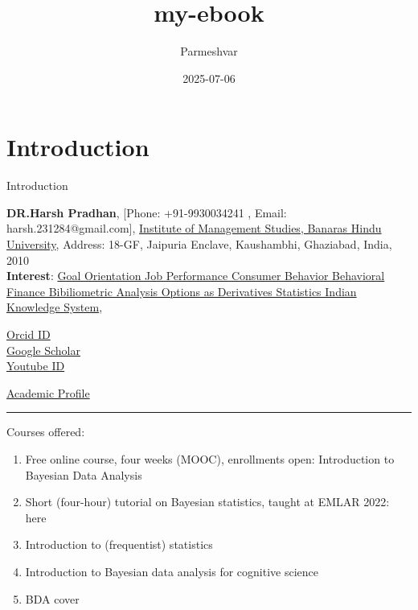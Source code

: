 \documentclass[
  letterpaper,
  DIV=11,
  numbers=noendperiod]{scrreprt}
\title{my-ebook}
\author{Parmeshvar}
\date{2025-07-06}
\providecommand{\tightlist}{%
  \setlength{\itemsep}{0pt}\setlength{\parskip}{0pt}}
\renewcommand*\contentsname{Table of contents}
\newcommand\contentsname{Table of contents}
\begin{document}
\maketitle

\renewcommand*\contentsname{Table of contents}
{
\hypersetup{linkcolor=}
\setcounter{tocdepth}{2}
\tableofcontents
}


\chapter{Introduction}\label{introduction}

Introduction

\textbf{DR.Harsh Pradhan}, {[}Phone: +91-9930034241 , Email:
harsh.231284@gmail.com{]},
\href{http://www.uni-potsdam.de/en/university-of-potsdam.html}{Institute
of Management Studies, Banaras Hindu University}, Address: 18-GF,
Jaipuria Enclave, Kaushambhi, Ghaziabad, India, 2010\\
\textbf{Interest}:
\href{http://www.uni-potsdam.de/humfak/hum-forschungsschwerpunkte/forschungscluster-sprache.html}{Goal
Orientation Job Performance Consumer Behavior Behavioral Finance
Bibiliometric Analysis Options as Derivatives Statistics Indian
Knowledge System},

\href{https://orcid.org/0000-0002-3332-3610}{Orcid ID}\\
\href{https://scholar.google.com/citations?user=8l5MEd0AAAAJ&hl=en&oi=sra}{Google
Scholar}\\
\href{http://www.youtube.com/@dr.harshpradhan742}{Youtube ID}

\href{https://bhu.ac.in/Site/FacultyProfile/1_5?FA000562}{Academic
Profile}

\begin{center}\rule{0.5\linewidth}{0.5pt}\end{center}

Courses offered:

\begin{enumerate}
\def\labelenumi{\arabic{enumi}.}
\tightlist
\item
  Free online course, four weeks (MOOC), enrollments open: Introduction
  to Bayesian Data Analysis
\item
  Short (four-hour) tutorial on Bayesian statistics, taught at EMLAR
  2022: here
\item
  Introduction to (frequentist) statistics
\item
  Introduction to Bayesian data analysis for cognitive science
\item
  BDA cover
\end{enumerate}
\end{document}
